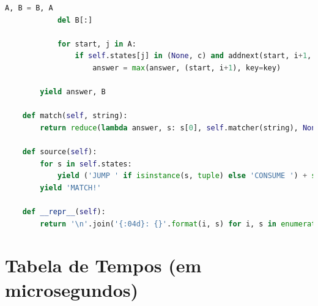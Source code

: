 \documentclass[a4paper,12pt,oneside,onecolumn]{uerj}
\begin{document}
\begin{lstlisting}[language=python]
            A, B = B, A
            del B[:]

            for start, j in A:
                if self.states[j] in (None, c) and addnext(start, i+1, j+1):
                    answer = max(answer, (start, i+1), key=key)
            
        yield answer, B
        
    def match(self, string):
        return reduce(lambda answer, s: s[0], self.matcher(string), None)
     
    def source(self):
        for s in self.states:
            yield ('JUMP ' if isinstance(s, tuple) else 'CONSUME ') + str(s)
        yield 'MATCH!'
       
    def __repr__(self):
        return '\n'.join('{:04d}: {}'.format(i, s) for i, s in enumerate(self.source()))
\end{lstlisting}   


\section{Tabela de Tempos (em microsegundos)}
\end{document}
